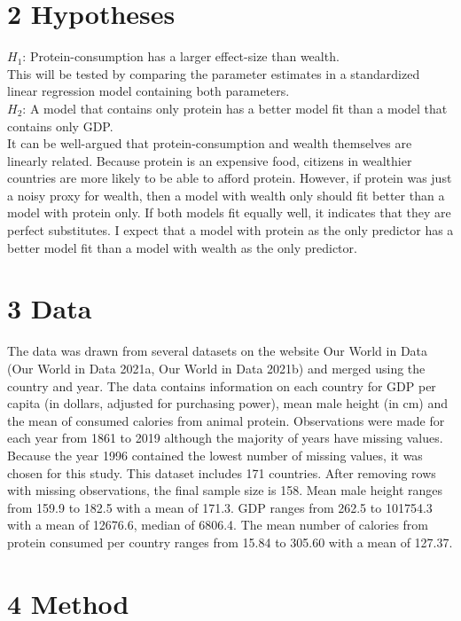 \documentclass[
]{article}
\begin{document}
\hypertarget{hypotheses}{%
\section{2 Hypotheses}\label{hypotheses}}

\(H_1\): Protein-consumption has a larger effect-size than wealth.\\
This will be tested by comparing the parameter estimates in a
standardized linear regression model containing both parameters.\\
\(H_2\): A model that contains only protein has a better model fit than
a model that contains only GDP.\\
It can be well-argued that protein-consumption and wealth themselves are
linearly related. Because protein is an expensive food, citizens in
wealthier countries are more likely to be able to afford protein.
However, if protein was just a noisy proxy for wealth, then a model with
wealth only should fit better than a model with protein only. If both
models fit equally well, it indicates that they are perfect substitutes.
I expect that a model with protein as the only predictor has a better
model fit than a model with wealth as the only predictor.

\hypertarget{data}{%
\section{3 Data}\label{data}}

The data was drawn from several datasets on the website Our World in
Data (Our World in Data 2021a, Our World in Data 2021b) and merged using
the country and year. The data contains information on each country for
GDP per capita (in dollars, adjusted for purchasing power), mean male
height (in cm) and the mean of consumed calories from animal protein.
Observations were made for each year from 1861 to 2019 although the
majority of years have missing values. Because the year 1996 contained
the lowest number of missing values, it was chosen for this study. This
dataset includes 171 countries. After removing rows with missing
observations, the final sample size is 158. Mean male height ranges from
159.9 to 182.5 with a mean of 171.3. GDP ranges from 262.5 to 101754.3
with a mean of 12676.6, median of 6806.4. The mean number of calories
from protein consumed per country ranges from 15.84 to 305.60 with a
mean of 127.37.

\hypertarget{method}{%
\section{4 Method}\label{method}}
\end{document}
